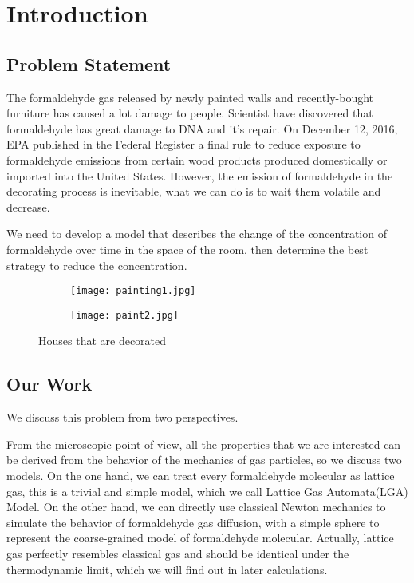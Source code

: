 \documentclass{mcmthesis}
\begin{document}
\maketitle

\tableofcontents

\newpage

\section{Introduction}	
\subsection{Problem Statement}
The formaldehyde gas released by newly painted walls and recently-bought furniture has caused a lot damage to people. Scientist have discovered that formaldehyde has great damage to DNA and it's repair\cite{grafstrom1983formaldehyde}.  On December 12, 2016, EPA published in the Federal Register a final rule\cite{marshall1987epa} to reduce exposure to formaldehyde emissions from certain wood products produced domestically or imported into the United States. However, the emission of formaldehyde in the decorating process is inevitable, what we can do is to wait them volatile and decrease.

We need to develop a model that describes the change of the concentration of formaldehyde over time in the space of the room, then determine the best strategy to reduce the concentration.

\begin{figure}[H]
  \centering
  \begin{subfigure}[b]{0.48\linewidth}
    \texttt{[image: painting1.jpg]}
  \end{subfigure}
  \begin{subfigure}[b]{0.48\linewidth}
    \texttt{[image: paint2.jpg]}
  \end{subfigure}
  \caption{Houses that are decorated}
  \label{fig:paint}
\end{figure}



\subsection{Our Work}
We discuss this problem from two perspectives.

From the microscopic point of view, all the properties that we are interested can be derived from the behavior of the mechanics of gas particles, so we discuss two models. On the one hand, we can treat every formaldehyde molecular as lattice gas, this is a trivial and simple model, which we call Lattice Gas Automata(LGA) Model. On the other hand, we can directly use classical Newton mechanics to simulate the behavior of formaldehyde gas diffusion, with a simple sphere to represent the coarse-grained model of formaldehyde molecular. Actually, lattice gas perfectly resembles classical gas and should be identical under the thermodynamic limit, which we will find out in later calculations.
\end{document}
